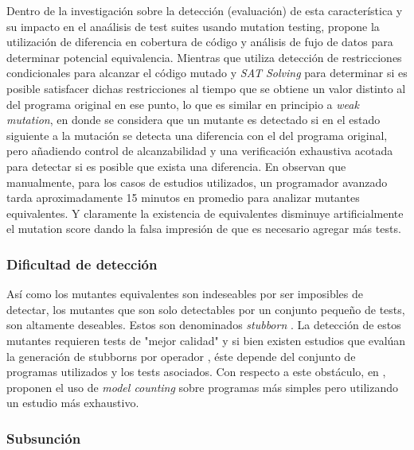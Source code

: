 Dentro de la investigaci\'on sobre la detecci\'on (evaluaci\'on) de esta caracter\'istica y su impacto en el ana\'alisis de test suites usando mutation testing, \cite{biblography.mutation.evaluation.equivalent.Schuler+10} propone la utilizaci\'on de diferencia en cobertura de c\'odigo y an\'alisis de fujo de datos para determinar potencial equivalencia. Mientras que  \cite{biblography.mutation.evaluation.equivalent.Just+13} utiliza detecci\'on de restricciones condicionales para alcanzar el c\'odigo mutado y \emph{SAT Solving} para determinar si es posible satisfacer dichas restricciones al tiempo que se obtiene un valor distinto al del programa original en ese punto, lo que es similar en principio a \emph{weak mutation}, en donde se considera que un mutante es detectado si en el estado siguiente a la mutaci\'on se detecta una diferencia con el del programa original, pero a\~nadiendo control de alcanzabilidad y una verificaci\'on exhaustiva acotada para detectar si es posible que exista una diferencia.
En \cite{biblography.mutation.evaluation.equivalent.Grun+09} observan que manualmente, para los casos de estudios utilizados, un programador avanzado tarda aproximadamente 15 minutos en promedio para analizar mutantes equivalentes. Y claramente la existencia de equivalentes disminuye artificialmente el mutation score dando la falsa impresi\'on de que es necesario agregar m\'as tests.

\subsubsection{Dificultad de detecci\'on}

As\'i como los mutantes equivalentes son indeseables por ser imposibles de detectar, los mutantes que son solo detectables por un conjunto peque\~no de tests, son altamente deseables. Estos son denominados \emph{stubborn} \cite{bibliography.mutation.evaluation.stubbornHieronsHD99}. La detecci\'on de estos mutantes requieren tests de "mejor calidad" y si bien existen estudios que eval\'uan la generaci\'on de stubborns por operador \cite{bibliography.mutation.evaluation.stubborn}, \'este depende del conjunto de programas utilizados y los tests asociados. Con respecto a este obst\'aculo, en \cite{bibliography.mutation.evaluation.hardnessVisser}, proponen el uso de \emph{model counting} sobre programas m\'as simples pero utilizando un estudio m\'as exhaustivo.

\subsubsection{Subsunci\'on}

